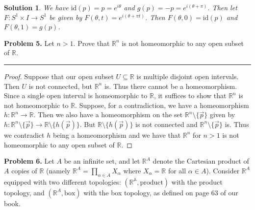 \documentclass[leqno]{article}
\theoremstyle{nonumberplain}
\newtheorem{proof}{Proof}
\newtheorem{solution}{Solution}
\begin{document}
\begin{solution}
We have $\textrm{id}(p)=p=e^{i\theta}$ and $g(p)=-p=e^{i(\theta+\pi)}$. Then let $F\colon S^1\times I \to S^1$ be given by $F(\theta,t)=e^{i(\theta+\pi t)}$. Then $F(\theta, 0)=\textrm{id}(p)$ and $F(\theta,1)=g(p)$.
\end{solution}


\pagebreak



\noindent\textbf{Problem 5.}  Let $n>1$. Prove that $\mathbb{R}^n$ is not homeomorphic to any open subset of $\mathbb{R}$.

\noindent\rule[0.5ex]{\linewidth}{1pt}

\begin{proof}
Suppose that our open subset $U\subseteq \mathbb{R}$ is multiple disjoint open intervals.  Then $U$ is not connected, but $\mathbb{R}^n$ is.  Thus there cannot be a homeomorphism.  Since a single open interval is homeomorphic to $\mathbb{R}$, it suffices to show that $\mathbb{R}^n$ is not homeomorphic to $\mathbb{R}$.  Suppose, for a contradiction, we have a homeomorphism $h\colon \mathbb{R}^n \to \mathbb{R}$.  Then we also have a homeomorphism on the set $\mathbb{R}^n\setminus \{\vec{p}\}$ given by $h\colon \mathbb{R}^n\setminus\{\vec{p}\} \to \mathbb{R}\setminus \{h(\vec{p})\}$.  But $\mathbb{R}\setminus \{h(\vec{p})\}$ is not connected and $\mathbb{R}^n\setminus \{\vec{p}\}$ is.  Thus we contradict $h$ being a homeomorphism and we have that $\mathbb{R}^n$ for $n>1$ is not homeomorphic to any open subset of $\mathbb{R}$.
\end{proof}


\pagebreak




\noindent\textbf{Problem 6.}  Let $A$ be an infinite set, and let $\mathbb{R}^A$ denote the Cartesian product of $A$ copies of $\mathbb{R}$ (namely $\mathbb{R}^A = \prod_{\alpha \in A} X_\alpha$ where $X_\alpha = \mathbb{R}$ for all $\alpha \in A$). Consider $\mathbb{R}^A$ equipped with two different topologies: $(\mathbb{R^A}, \textrm{product})$ with the product topology, and $(\mathbb{R}^A,\textrm{box})$ with the box topology, as defined on page 63 of our book.
\end{document}
